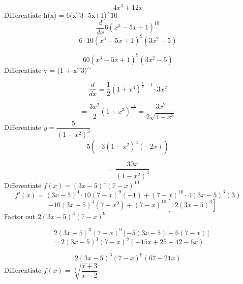 \documentclass{report}
\begin{document}
$$ 4x^3 + 12x$$ 
\bigbreak \noindent
\q
\bigbreak \noindent
Differentiate h(x) = 6\left(x^3 -5x+1\right)^{10}
\bigbreak \noindent
$$ \frac{d}{dx}6\left(x^3-5x+1\right)^{10}$$
$$6 \cdot 10\left(x^3 - 5x +1\right)^{9}\left(3x^2 -5\right)$$

$$ 60(x^3-5x+1)^9(3x^2-5)$$
\bigbreak \noindent
\q
\bigbreak \noindent
Differentiate y = (1 + x^3)^{}
\bigbreak \noindent

$$ \frac{d}{dx} = \dfrac{1}{2}(1+x^3)^{\frac{1}{2} - 1 } \cdot 3x^2$$

$$ = \dfrac{3x^2}{2}\left(1 + x^3\right)^{\frac{-1}{2}} = \dfrac{3x^2}{2\sqrt{1 + x^3}}$$
\bigbreak \noindent
\q
\bigbreak \noindent
Differentiate $y = \dfrac{5}{ \left(1-x^2\right)^3}$
\bigbreak \noindent
$$ 5 \left(-3 \left(1 -x^2\right)^4 \left(-2x\right) \right)$$

$$ = \dfrac{30x}{ \left(1-x^2\right)^4}$$
\pagebreak
\q
\bigbreak \noindent
Differentiate $f(x) = (3x-5)^4 \left(7 -x\right)^{10}$
\bigbreak \noindent
$$ f'(x) = (3x - 5)^4 \cdot 10(7 - x)^9(-1) + (7-x)^{10} \cdot 4(3x-5)^3(3)$$
$$ = -10 (3x-5)^4(7-x^{9}) + (7 - x)^{10}\left[12(3x-5)^3\right]$$
\bigbreak \noindent
Factor out $2(3x-5)^3(7-x)^9$

$$= 2(3x-5)^3 (7-x)^9[-5(3x-5) + 6(7-x)]$$
$$ = 2(3x - 5)^3 (7-x)^9 (-15x+25+42-6x)$$

$$ 2(3x-5)^3(7-x)^9(67 - 21x)$$
\bigbreak \noindent
\q
\bigbreak \noindent
Differentiate $f(x) = \sqrt[4]{\dfrac{x+3}{x-2}}$
\bigbreak \noindent
\end{document}
